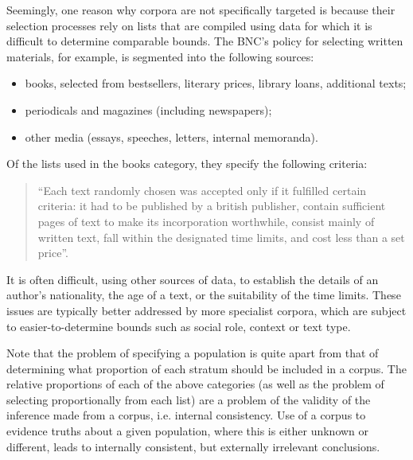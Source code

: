 Seemingly, one reason why corpora are not specifically targeted is because their selection processes rely on lists that are compiled using data for which it is difficult to determine comparable bounds.  The BNC's policy for selecting written materials, for example, is segmented into the following sources:

\begin{itemize}
 \item books, selected from bestsellers, literary prices, library loans, additional texts;
 \item periodicals and magazines (including newspapers);
 \item other media (essays, speeches, letters, internal memoranda).
\end{itemize}

Of the lists used in the books category, they specify the following criteria:

\begin{quote}
``Each text randomly chosen was accepted only if it fulfilled certain criteria: it had to be published by a british publisher, contain sufficient pages of text to make its incorporation worthwhile, consist mainly of written text, fall within the designated time limits, and cost less than a set price''.
\end{quote}

It is often difficult, using other sources of data, to establish the details of an author's nationality, the age of a text, or the suitability of the time limits\cite{dollinger2006oh}.
These issues are typically better addressed by more specialist corpora, which are subject to easier-to-determine bounds such as social role, context or text type\cite{kucera2002czech,przepiorkowski2008towards,kyto1993manual}.

Note that the problem of specifying a population is quite apart from that of determining what proportion of each stratum should be included in a corpus.  The relative proportions of each of the above categories (as well as the problem of selecting proportionally from each list) are a problem of the validity of the inference made from a corpus, i.e. internal consistency.  Use of a corpus to evidence truths about a given population, where this is either unknown or different, leads to internally consistent, but externally irrelevant conclusions.

